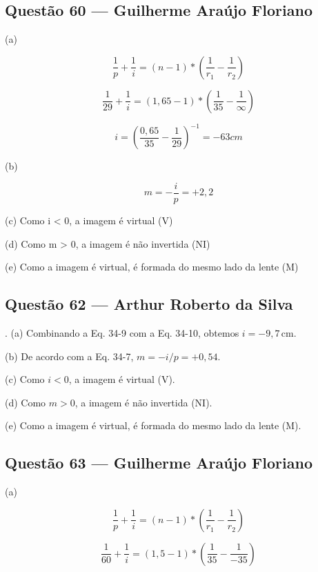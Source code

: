 \documentclass[12pt,a4paper]{article}
\begin{document}
\subsection{Questão 60 — Guilherme Araújo Floriano}

(a) 

\[   
\frac{1}{p} + \frac{1}{i} = (n-1)*(\frac{1}{r_1} - \frac{1}{r_2})
\]

\[
\frac{1}{29} + \frac{1}{i} = (1,65-1)*(\frac{1}{35} - \frac{1}{\infty})
\]

\[
i = (\frac{0,65}{35} - \frac{1}{29})^{-1} = -63cm
\]

(b)

\[
m = -\frac{i}{p} = +2,2  
\]

(c) Como i < 0, a imagem é virtual (V)

(d) Como m > 0, a imagem é não invertida (NI)

(e) Como a imagem é virtual, é formada do mesmo lado da lente (M)

\subsection{Questão 62 — Arthur Roberto da Silva}
. (a) Combinando a Eq. 34-9 com a Eq. 34-10, obtemos $i = -9,7 \, \text{cm}$.

\vspace{0.4cm}

\noindent (b) De acordo com a Eq. 34-7, $m = -i/p = +0,54$.

\vspace{0.4cm}

\noindent (c) Como $i < 0$, a imagem é virtual (V).

\vspace{0.4cm}

\noindent (d) Como $m > 0$, a imagem é não invertida (NI).

\vspace{0.4cm}

\noindent (e) Como a imagem é virtual, é formada do mesmo lado da lente (M).

\subsection{Questão 63 — Guilherme Araújo Floriano}

(a) 

\[   
\frac{1}{p} + \frac{1}{i} = (n-1)*(\frac{1}{r_1} - \frac{1}{r_2})
\]

\[
\frac{1}{60} + \frac{1}{i} = (1,5-1)*(\frac{1}{35} - \frac{1}{-35})
\]
\end{document}
